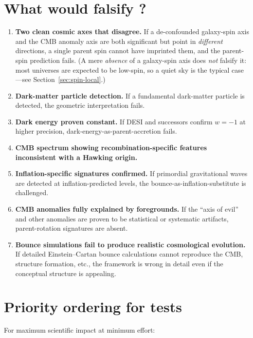 \section{What would falsify \SCT?}

\begin{enumerate}
  \item \textbf{Two clean cosmic axes that disagree.} If a de-confounded galaxy-spin
    axis and the CMB anomaly axis are both significant but point in \emph{different}
    directions, a single parent spin cannot have imprinted them, and the parent-spin
    prediction fails. (A mere \emph{absence} of a galaxy-spin axis does \emph{not}
    falsify it: most universes are expected to be low-spin, so a quiet sky is the
    typical case---see Section~\ref{sec:spin-local}.)
  \item \textbf{Dark-matter particle detection.} If a fundamental dark-matter
    particle is detected, the geometric interpretation fails.
  \item \textbf{Dark energy proven constant.} If DESI and successors confirm
    $w = -1$ at higher precision, dark-energy-as-parent-accretion fails.
  \item \textbf{CMB spectrum showing recombination-specific features inconsistent
    with a Hawking origin.}
  \item \textbf{Inflation-specific signatures confirmed.} If primordial
    gravitational waves are detected at inflation-predicted levels, the
    bounce-as-inflation-substitute is challenged.
  \item \textbf{CMB anomalies fully explained by foregrounds.} If the ``axis of
    evil'' and other anomalies are proven to be statistical or systematic
    artifacts, parent-rotation signatures are absent.
  \item \textbf{Bounce simulations fail to produce realistic cosmological
    evolution.} If detailed Einstein--Cartan bounce calculations cannot reproduce
    the CMB, structure formation, etc., the framework is wrong in detail even if
    the conceptual structure is appealing.
\end{enumerate}

\section{Priority ordering for tests}

For maximum scientific impact at minimum effort:

